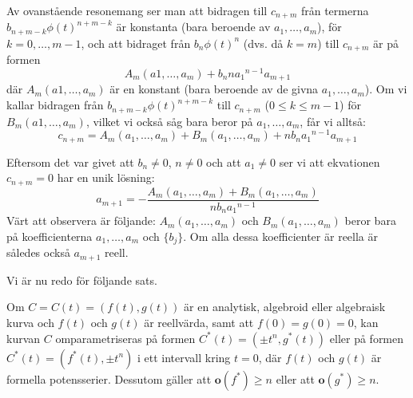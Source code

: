Av ovanstående resonemang ser man att bidragen till $c_{n+m}$ från termerna $b_{n+m-k} \phi(t)^{n+m-k}$ är konstanta (bara beroende av $a_1, \ldots, a_m$), för $k = 0, \ldots , m - 1$, och att bidraget från $b_n \phi(t)^n$ (dvs. då $k = m$) till $c_{n+m}$ är på formen
\[A_m(a1, \ldots, a_m) + b_n n {a_1}^{n-1} a_{m+1}\]
där $A_m(a1, \ldots, a_m)$ är en konstant (bara beroende av de givna $a_1, \ldots, a_m$). Om vi kallar bidragen från $b_{n+m-k} \phi(t)^{n+m-k}$ till $c_{n+m}$ ($0 \leq k \leq m-1$) för $B_m(a1, \ldots, a_m)$, vilket vi också såg bara beror på $a_1, \ldots, a_m$, får vi alltså:
\[c_{n+m} = A_m(a_1, \ldots, a_m) + B_m(a_1, \ldots, a_m) + n b_n {a_1}^{n-1} a_{m+1}\]

Eftersom det var givet att $b_n \neq 0$, $n \neq 0$ och att $a_1 \neq 0$ ser vi att ekvationen $c_{n+m} = 0$ har en unik lösning:
\[a_{m+1} = -\frac{A_m(a_1, \ldots, a_m) + B_m(a_1, \ldots, a_m)}{n b_n {a_1}^{n-1}}\]
Värt att observera är följande: $A_m(a_1, \ldots, a_m)$ och $B_m(a_1, \ldots, a_m)$ beror bara på koefficienterna $a_1, \ldots, a_m$ och $\{b_j\}$. Om alla dessa koefficienter är reella är således också $a_{m+1}$ reell.

Vi är nu redo för följande sats.

\begin{Theorem}
\label{ReparametrizeTheorem}
Om $C = C(t) = \left(f(t), g(t)\right)$ är en analytisk, algebroid eller algebraisk kurva och $f(t)$ och $g(t)$ är reellvärda, samt att $f(0) = g(0) = 0$, kan kurvan $C$ omparametriseras på formen $C^*(t) = \left(\pm t^n, g^*(t)\right)$ eller på formen $C^*(t) = \left(f^*(t), \pm t^n \right)$ i ett intervall kring $t = 0$, där $f(t)$ och $g(t)$ är formella potensserier. Dessutom gäller att $\mathbf{o}\left(f^*\right) \geq n$ eller att $\mathbf{o}\left(g^*\right) \geq n$.
\end{Theorem}


